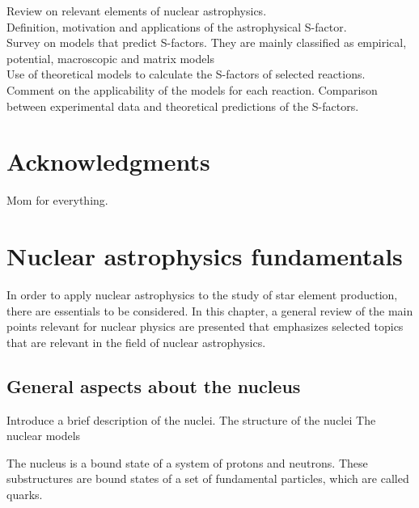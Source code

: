 \documentclass[openany]{book}
\begin{document}
Review on relevant elements of nuclear astrophysics. \\

Definition, motivation and applications of the astrophysical S-factor. \\

Survey on models that predict S-factors. They are mainly classified as empirical, potential, macroscopic and matrix models \\

Use of theoretical models to calculate the S-factors of selected reactions. \\

Comment on the applicability of the models for each reaction. Comparison between experimental data and theoretical predictions of the S-factors.

\clearpage

\chapter*{Acknowledgments}

Mom for everything.

\clearpage

\tableofcontents
\listoffigures
\listoftables



\chapter{Nuclear astrophysics fundamentals}  \label{ch:nuclearAstrophysics}

In order to apply nuclear astrophysics to the study of star element production, there are essentials to be considered. In this chapter, a general review of the main points relevant for nuclear physics are presented that emphasizes selected topics that are relevant in the field of nuclear astrophysics.

\section{General aspects about the nucleus} \label{sec:nucleiAspects}
Introduce a brief description of the nuclei.
\indent The structure of the nuclei
\indent The nuclear models

The nucleus is a bound state of a system of protons and neutrons. These substructures are bound states of a set of fundamental particles, which are called quarks.  \\
\end{document}
